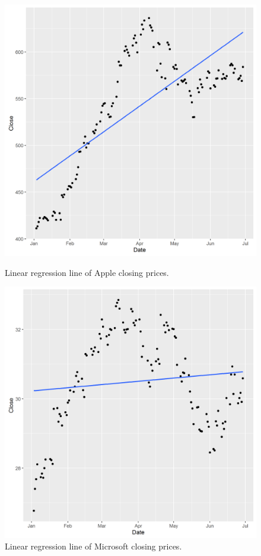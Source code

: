 \documentclass[paper=a4, fontsize=11pt]{scrartcl} %
\numberwithin{equation}{section} %
\numberwithin{figure}{section} %
\numberwithin{table}{section} %
\begin{document}
\begin{figure}[!htb]
  \includegraphics[width=\linewidth]{graph/a_reg3.png}
  \caption{Linear regression line of Apple closing prices.}
\endminipage\hfill
{}
  \includegraphics[width=\linewidth]{graph/m_reg3.png}
  \caption{Linear regression line of Microsoft closing prices.}
\endminipage\hfill
\end{figure}
\end{document}

